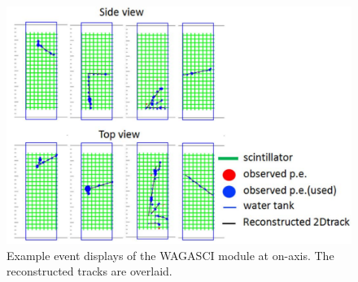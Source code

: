 \begin{figure}[tbhp]
\begin{center}
\includegraphics[width=\textwidth]{fig/wagascieventdisp.pdf}
\end{center}
\caption{
  Example event displays of the WAGASCI module at on-axis.
  The reconstructed tracks are overlaid.}
\label{fig:onaxis_eventdisplay}
\end{figure}
%
